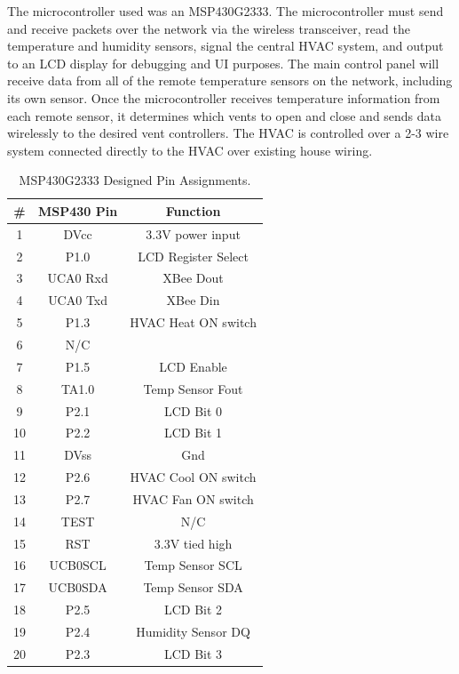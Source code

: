 The microcontroller used was an MSP430G2333\cite{4}. The microcontroller must send and receive packets over the network via the wireless transceiver, read the temperature and humidity sensors, signal the central HVAC system, and output to an LCD display for debugging and UI purposes. The main control panel will receive  data from all of the remote temperature sensors on the network, including its own sensor. Once the microcontroller receives temperature information from each remote sensor, it determines which vents to open and close and sends data wirelessly to the desired vent controllers. The HVAC is controlled over a 2-3 wire system connected directly to the HVAC over existing house wiring.
\begin{table}[htbp]
\centering
\begin{tabular}{|c|c|c|}
\hline
\textbf{\#} & \textbf{MSP430 Pin} & \textbf{Function} \bigstrut\\
\hline
\hline
1 & DVcc & 3.3V power input \bigstrut\\
\hline
2 & P1.0 & LCD Register Select \bigstrut\\
\hline
3 & UCA0 Rxd & XBee Dout \bigstrut\\
\hline
4 & UCA0 Txd & XBee Din \bigstrut\\
\hline
5 & P1.3 & HVAC Heat ON switch \bigstrut\\
\hline
6 & N/C & \bigstrut\\
\hline
7 & P1.5 & LCD Enable \bigstrut\\
\hline
8 & TA1.0 & Temp Sensor Fout \bigstrut\\
\hline
9 & P2.1 & LCD Bit 0 \bigstrut\\
\hline
10 & P2.2 & LCD Bit 1 \bigstrut\\
\hline
11 & DVss & Gnd \bigstrut\\
\hline
12 & P2.6 & HVAC Cool ON switch \bigstrut\\
\hline
13 & P2.7 & HVAC Fan ON switch \bigstrut\\
\hline
14 & TEST & N/C \bigstrut\\
\hline
15 & RST & 3.3V tied high \bigstrut\\
\hline
16 & UCB0SCL & Temp Sensor SCL \bigstrut\\
\hline
17 & UCB0SDA & Temp Sensor SDA \bigstrut\\
\hline
18 & P2.5 & LCD Bit 2 \bigstrut\\
\hline
19 & P2.4 & Humidity Sensor DQ \bigstrut\\
\hline
20 & P2.3 & LCD Bit 3 \bigstrut\\
\hline
\end{tabular}%
\caption{MSP430G2333 Designed Pin Assignments.}
\label{tab:msp_inout}%
\end{table}%

